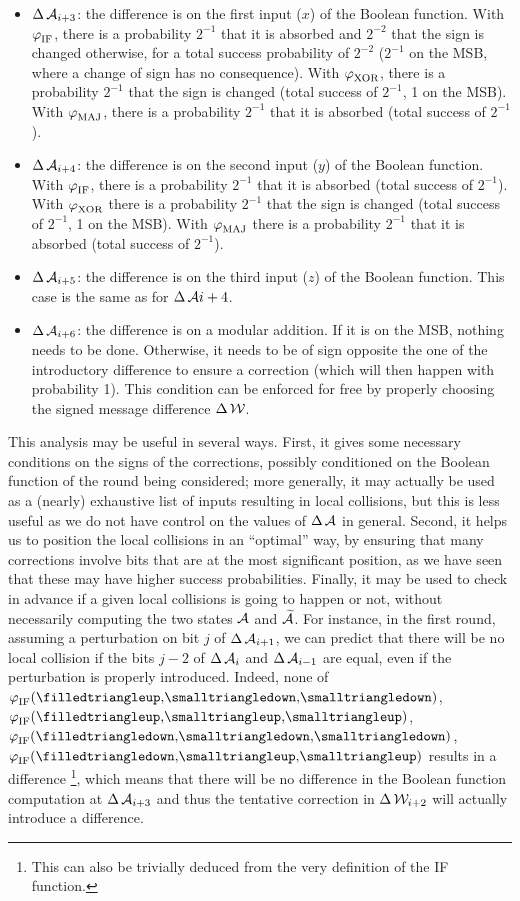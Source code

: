 \begin{itemize}
\item $\operatorname{\Delta}\mathcal{A}_{i+3}$: the difference is on the first input ($x$) of the Boolean function. With $\operatorname{\varphi}_\text{IF}$, there is a probability $2^{-1}$ that it is absorbed and $2^{-2}$
that the sign is changed otherwise, for a total success probability of $2^{-2}$ ($2^{-1}$ on the MSB, where a change of sign has no consequence).
With $\operatorname{\varphi}_\text{XOR}$, there is a probability $2^{-1}$ that the sign is changed (total success of $2^{-1}$, 1 on the MSB).
With $\operatorname{\varphi}_\text{MAJ}$, there is a probability $2^{-1}$ that it is absorbed (total success of $2^{-1}$).
\item  $\operatorname{\Delta}\mathcal{A}_{i+4}$: the difference is on the second input ($y$) of the Boolean function. With $\operatorname{\varphi}_\text{IF}$, there is a probability $2^{-1}$ that it is absorbed (total success of $2^{-1}$).
With $\operatorname{\varphi}_\text{XOR}$ there is a probability $2^{-1}$ that the sign is changed (total success of $2^{-1}$, 1 on the MSB). With $\operatorname{\varphi}_\text{MAJ}$ there is a probability $2^{-1}$ that it is absorbed (total success of
$2^{-1}$).
\item $\operatorname{\Delta}\mathcal{A}_{i+5}$: the difference is on the third input ($z$) of the Boolean function. This case is the same as for $\operatorname{\Delta}\mathcal{A}{i+4}$.
\item $\operatorname{\Delta}\mathcal{A}_{i+6}$: the difference is on a modular addition. If it is on the MSB, nothing needs to be done. Otherwise, it needs to be of sign opposite the one of the introductory difference to
ensure a correction (which will then happen with probability 1). This condition can be enforced for free by properly choosing the signed message difference $\operatorname{\Delta}\mathcal{W}$.
\end{itemize}

This analysis may be useful in several ways. First, it gives some necessary conditions on the signs of the corrections, possibly conditioned on the Boolean function of the round being considered;
more generally, it may actually be used as a (nearly) exhaustive list of inputs resulting in local collisions, but this is less useful as we do not have control on the values of $\operatorname{\Delta}\mathcal{A}$ in general. Second,
it helps us to position the local collisions in an ``optimal'' way, by ensuring that many corrections involve bits that are at the most significant position, as we have seen that these may
have higher success probabilities. Finally, it
may be used to check in advance if a given local collisions is going to happen or not, without necessarily computing the two states $\mathcal{A}$ and $\mathcal{\widetilde A}$. For instance, in the first round,
assuming a perturbation on bit $j$ of $\operatorname{\Delta}\mathcal{A}_{i+1}$, we can predict that there will be no local collision if the bits $j - 2$ of $\operatorname{\Delta}\mathcal{A}_{i}$ and $\operatorname{\Delta}\mathcal{A}_{i-1}$ are equal, even if the perturbation is properly
introduced. Indeed, none of $\fif(\text{\onediffu,\nodiffz,\nodiffz})$, $\fif(\text{\onediffu,\nodiffo,\nodiffo})$, $\fif(\text{\onediffd,\nodiffz,\nodiffz})$, $\fif(\text{\onediffd,\nodiffo,\nodiffo})$
results in a difference
\footnote{This can also be trivially deduced from the very definition of the IF function.}, which means that there will be no difference in the Boolean function computation at $\operatorname{\Delta}\mathcal{A}_{i+3}$ and thus the tentative correction
in $\operatorname{\Delta}\mathcal{W}_{i+2}$ will actually introduce a difference.


